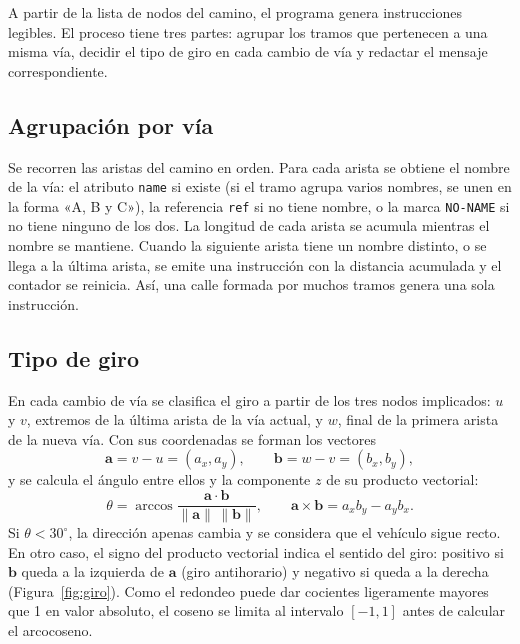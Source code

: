 \documentclass[11pt,a4paper]{article}
\newcommand{\code}[1]{\texttt{#1}}
\begin{document}
A partir de la lista de nodos del camino, el programa genera instrucciones legibles. El proceso tiene tres partes: agrupar los tramos que pertenecen a una misma vía, decidir el tipo de giro en cada cambio de vía y redactar el mensaje correspondiente.

\subsection{Agrupación por vía}

Se recorren las aristas del camino en orden. Para cada arista se obtiene el nombre de la vía: el atributo \code{name} si existe (si el tramo agrupa varios nombres, se unen en la forma «A, B y C»), la referencia \code{ref} si no tiene nombre, o la marca \code{NO-NAME} si no tiene ninguno de los dos. La longitud de cada arista se acumula mientras el nombre se mantiene. Cuando la siguiente arista tiene un nombre distinto, o se llega a la última arista, se emite una instrucción con la distancia acumulada y el contador se reinicia. Así, una calle formada por muchos tramos genera una sola instrucción.

\subsection{Tipo de giro}

En cada cambio de vía se clasifica el giro a partir de los tres nodos implicados: $u$ y $v$, extremos de la última arista de la vía actual, y $w$, final de la primera arista de la nueva vía. Con sus coordenadas se forman los vectores
\[
\mathbf a = v-u = (a_x,a_y),\qquad \mathbf b = w-v = (b_x,b_y),
\]
y se calcula el ángulo entre ellos y la componente $z$ de su producto vectorial:
\[
\theta=\arccos\frac{\mathbf a\cdot\mathbf b}{\lVert\mathbf a\rVert\,\lVert\mathbf b\rVert},\qquad
\mathbf a\times\mathbf b=a_x b_y-a_y b_x .
\]
Si $\theta<30^\circ$, la dirección apenas cambia y se considera que el vehículo sigue recto. En otro caso, el signo del producto vectorial indica el sentido del giro: positivo si $\mathbf b$ queda a la izquierda de $\mathbf a$ (giro antihorario) y negativo si queda a la derecha (Figura~\ref{fig:giro}). Como el redondeo puede dar cocientes ligeramente mayores que 1 en valor absoluto, el coseno se limita al intervalo $[-1,1]$ antes de calcular el arcocoseno.
\end{document}
